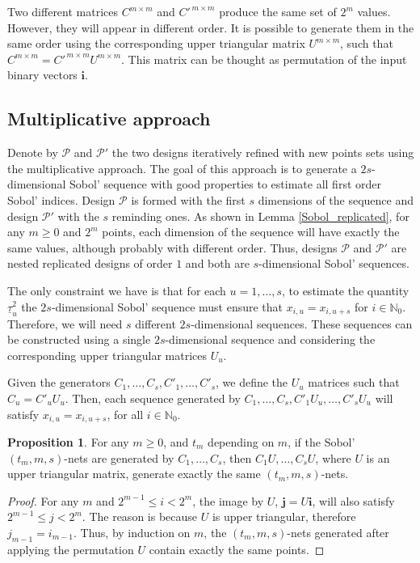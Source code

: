 \documentclass[]{elsarticle}
\theoremstyle{definition}
\newtheorem{prop}{Proposition}
\newcommand{\bvec}[1]{\boldsymbol{#1}}
\newcommand{\vi}{\bvec{i}}
\newcommand{\vj}{\bvec{j}}
\begin{document}
Two different matrices $C^{m\times m}$ and $C'^{\,m\times m}$ produce the same set of $2^m$ values. However, they will appear in different order. It is possible to generate them in the same order using the corresponding upper triangular matrix $U^{m\times m}$, such that $C^{m\times m}=C'^{\,m\times m}U^{m\times m}$. This matrix can be thought as permutation of the input binary vectors $\vi$.

\subsection{Multiplicative approach}
Denote by $\mathcal{P}$ and $\mathcal{P}'$ the two designs iteratively refined with new points sets using the multiplicative approach. %
The goal of this approach is to generate a $2s$-dimensional Sobol' sequence with good properties to estimate all first order Sobol' indices. Design $\mathcal{P}$ is formed with the first $s$ dimensions of the sequence and design $\mathcal{P}'$ with the $s$ reminding ones. As shown in Lemma \ref{Sobol_replicated}, for any $m\geq 0$ and $2^m$ points, each dimension of the sequence will have exactly the same values, although probably with different order. Thus, designs $\mathcal{P}$ and $\mathcal{P}'$ are nested replicated designs of order $1$ and both are $s$-dimensional Sobol' sequences.

The only constraint we have is that for each $u=1,\dots,s$, to estimate the quantity $\underline{\tau}_u^2$ the $2s$-dimensional Sobol' sequence must ensure that $x_{i,u}=x_{i,u+s}$ for $i\in\mathbb{N}_0$. Therefore, we will need $s$ different $2s$-dimensional sequences. These sequences can be constructed using a single $2s$-dimensional sequence and considering the corresponding upper triangular matrices $U_u$.

Given the generators $C_1,\dots,C_s,C'_1,\dots,C'_s$, we define the $U_u$ matrices such that $C_u=C'_uU_u$. Then, each sequence generated by $C_1,\dots,C_s,C'_1U_u,\dots,C'_sU_u$ will satisfy $x_{i,u}=x_{i,u+s}$, for all $i\in\mathbb{N}_0$.

\begin{prop}
For any $m\geq 0$, and $t_m$ depending on $m$, if the Sobol' $(t_m,m,s)$-nets are generated by $C_1,\dots,C_s$, then $C_1U,\dots,C_sU$, where $U$ is an upper triangular matrix, generate exactly the same $(t_m,m,s)$-nets.
\end{prop}
\begin{proof}
For any $m$ and $2^{m-1}\leq i < 2^m$, the image by $U$, $\vj=U\vi$, will also satisfy $2^{m-1}\leq j < 2^m$. The reason is because $U$ is upper triangular, therefore $j_{m-1}=i_{m-1}$. Thus, by induction on $m$, the $(t_m,m,s)$-nets generated after applying the permutation $U$ contain exactly the same points.
\end{proof}
\end{document}
